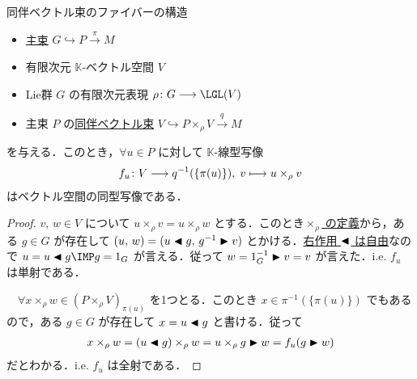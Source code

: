 \documentclass[TQFT_main]{subfiles}
\begin{document}
\begin{mylem}[label=lem:assoc-basic,breakable]{同伴ベクトル束のファイバーの構造}
    \begin{itemize}
        \item \hyperref[def.PFD]{主束} $G \hookrightarrow P \xrightarrow{\pi} M$
        \item 有限次元 $\mathbb{K}$-ベクトル空間 $V$
        \item Lie群 $G$ の有限次元表現 $\rho \colon G \lto \LGL(V)$
        \item 主束 $P$ の\hyperref[def:associated-vect]{同伴ベクトル束} $V \hookrightarrow P \times_\rho V \xrightarrow{q} M$
    \end{itemize}
    を与える．このとき，$\forall u \in P$ に対して $\mathbb{K}$-線型写像
    \begin{align}
        f_u \colon V \longrightarrow q^{-1}(\{\pi(u)\}),\; v \longmapsto u \times_\rho v
    \end{align}
    はベクトル空間の同型写像である．
\end{mylem}

\begin{proof}
    $v,\, w \in V$ について $u \times_\rho v = u \times_\rho w$ とする．このとき\hyperref[prop:Borelconst]{$\times_\rho$ の定義}から，ある $g \in G$ が存在して $(u,\, w) = (u \blacktriangleleft g,\, g^{-1} \blacktriangleright v)$ とかける．\hyperref[prop.PFD_right]{右作用 $\blacktriangleleft$ は自由}なので $u = u \btl g \IMP g = 1_G$ が言える．従って $w = 1_G^{-1} \blacktriangleright v = v$ が言えた．i.e. $f_u$ は単射である．

    　$\forall x \times_\rho w \in (P \times_\rho V)_{\pi(u)}$ を1つとる．このとき $x \in \pi^{-1}(\{\pi(u)\})$ でもあるので，ある $g \in G$ が存在して $x = u \blacktriangleleft g$ と書ける．従って
    \begin{align}
        x \times_\rho w = (u \blacktriangleleft g) \times_\rho w = u \times_\rho g \blacktriangleright w = f_u(g \blacktriangleright w)
    \end{align}
    だとわかる．i.e. $f_u$ は全射である．
\end{proof}
\end{document}
